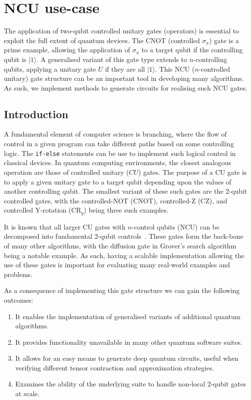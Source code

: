 \section{NCU use-case}
The application of two-qubit controlled unitary gates (operators) is essential to exploit the full extent of quantum devices. The CNOT (controlled $\sigma_x$) gate is a prime example, allowing the application of $\sigma_x$ to a target qubit if the controlling qubit is $\vert 1 \rangle$. A generalised variant of this gate type extends to $n$-controlling qubits, applying a unitary gate $U$ if they are all $\vert 1 \rangle$. This NCU ($n$-controlled unitary) gate structure can be an important tool in developing many algorithms. As such, we implement methods to generate circuits for realising such NCU gates.

\subsection{Introduction}
A fundamental element of computer science is branching, where the flow of control in a given program can take different paths based on some controlling logic. The \verb+if-else+ statements can be use to implement such logical control in classical devices. In quantum computing environments, the closest analogous operation are those of controlled unitary ($CU$) gates. The purpose of a CU gate is to apply a given unitary gate to a target qubit depending upon the values of another controlling qubit. The smallest variant of these such gates are the 2-qubit controlled gates, with the controlled-NOT (CNOT), controlled-Z (CZ), and controlled Y-rotation (CR$_{y}$) being three such examples. 

It is known that all larger CU gates with $n$-control qubits (NCU) can be decomposed into fundamental 2-qubit controls~\cite{barenco_elementary_1995}. These gates form the back-bone of many other algorithms, with the diffusion gate in Grover's search algorithm~\cite{grover_1996} being a notable example. As such, having a scalable implementation allowing the use of these gates is important for evaluating many real-world examples and problems.

As a consequence of implementing this gate structure we can gain the following outcomes:

\begin{enumerate}
\item It enables the implementation of generalised variants of additional quantum algorithms.
\item It provides functionality unavailable in many other quantum software suites.
\item It allows for an easy means to generate deep quantum circuits, useful when verifying different tensor contraction and approximation strategies.
\item Examines the ability of the underlying suite to handle non-local 2-qubit gates at scale.
\end{enumerate}


